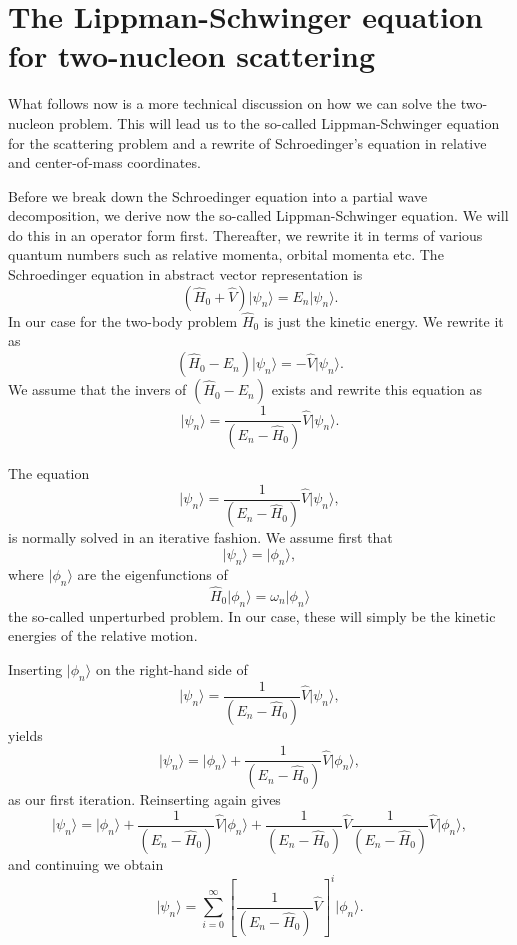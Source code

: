 \documentclass[graybox,sectrefs,envcountresetchap,open=right]{svmonodo}
\begin{document}
\noindent
\section{The Lippman-Schwinger equation for two-nucleon scattering}

What follows now is a more technical discussion on how we can solve the two-nucleon problem.
This will lead us to the so-called Lippman-Schwinger equation for the scattering problem and a rewrite of Schroedinger's equation in relative and center-of-mass coordinates. 


Before we break down the Schroedinger equation into a partial wave decomposition, we derive now the so-called Lippman-Schwinger equation. We will do this in an operator form first.
Thereafter, we rewrite it in terms of various quantum numbers such as relative momenta, orbital momenta etc. 
The Schroedinger equation in abstract vector representation is
\[
  \left( \hat{H}_0 + \hat{V} \right) \vert \psi_n \rangle = E_n \vert\psi_n \rangle. 
\]
In our case for the two-body problem $\hat{H}_0$ is just the kinetic energy. 
We rewrite it as 
\[
\left( \hat{H}_0 -E_n \right)\vert\psi_n \rangle =-\hat{V}\vert \psi_n \rangle . 
\]
We assume that the invers of $\left( \hat{H}_0 -E_n\right)$ exists and rewrite this equation as
\[
\vert\psi_n \rangle =\frac{1}{\left( E_n -\hat{H}_0\right)}\hat{V}\vert \psi_n \rangle . 
\]





The equation
\[
\vert \psi_n \rangle =\frac{1}{\left( E_n -\hat{H}_0\right)}\hat{V}\vert \psi_n \rangle,
\]
is normally solved in an iterative fashion. 
We assume first that
\[
\vert\psi_n \rangle = \vert\phi_n \rangle,
\] 
where $\vert\phi_n \rangle$ are the eigenfunctions of 
\[
\hat{H}_0\vert \phi_n \rangle=\omega_n\vert \phi_n \rangle
\]
the so-called unperturbed problem. In our case, these will simply be the kinetic energies of the relative motion. 



Inserting  $\vert\phi_n \rangle$  on the right-hand side of 
\[
\vert \psi_n \rangle =\frac{1}{( E_n -\hat{H}_0)}\hat{V}\vert \psi_n \rangle,
\]
yields
\[
\vert \psi_n \rangle =\vert\phi_n \rangle+\frac{1}{\left( E_n -\hat{H}_0\right)}\hat{V}\vert \phi_n \rangle,
\]
as our first iteration. 
Reinserting again gives
\[
\vert \psi_n \rangle =\vert\phi_n \rangle+\frac{1}{\left( E_n -\hat{H}_0\right)}\hat{V}\vert \phi_n \rangle+\frac{1}{( E_n -\hat{H}_0)}\hat{V}\frac{1}{\left( E_n -\hat{H}_0\right)}\hat{V}\vert \phi_n \rangle,
\]
and continuing we obtain
\[
\vert \psi_n \rangle =\sum_{i=0}^{\infty}\left[\frac{1}{( E_n -\hat{H}_0)}\hat{V}\right]^i\vert \phi_n \rangle.
\]
\end{document}
